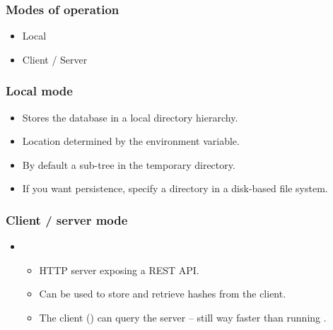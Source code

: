 \documentclass[compress,table,xcolor=table]{beamer}
\begin{document}
\begin{frame}
  \frametitle{Modes of operation}
    \Huge
    \begin{itemize}
        \item Local
        \item Client / Server
    \end{itemize}
\end{frame}
\begin{frame}
    \frametitle{Local mode}
    \LARGE
    \begin{itemize}
        \item Stores the database in a local directory hierarchy.
        \item Location determined by the  environment
            variable.
        \item By default a sub-tree in the temporary directory.
        \item If you want persistence, specify a directory in
            a disk-based file system.
    \end{itemize}
\end{frame}
\begin{frame}
    \frametitle{Client / server mode}
    \LARGE
    \begin{itemize}
        \item {}
        \begin{itemize}
            \Large
            \item HTTP server exposing a REST API.
            \item Can be used to store and retrieve hashes from the client.
            \item The client () can query
                the server -- still {\larger way} faster than running
                .
        \end{itemize}
    \end{itemize}
\end{frame}
\end{document}
